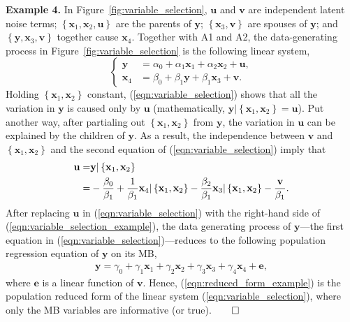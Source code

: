 \documentclass[11pt,review,authoryear]{elsarticle}
\begin{document}
\noindent
\textbf{Example 4.} In Figure~\ref{fig:variable_selection}, $\mathbf{u}$ and $\mathbf{v}$ are independent latent noise terms; $\left\{\mathbf{x}_1, \mathbf{x}_2, \mathbf{u}\right\}$ are the parents of $\mathbf{y}$; $\left\{\mathbf{x}_3, \mathbf{v}\right\}$ are spouses of $\mathbf{y}$; and $\left\{\mathbf{y}, \mathbf{x}_3, \mathbf{v}\right\}$ together cause $\mathbf{x}_4$. Together with A1 and A2, the data-generating process in Figure~\ref{fig:variable_selection} is the following linear system,
%
\begin{equation}
  \begin{cases}
    \mathbf{y}   & = \alpha_0 + \alpha_1 \mathbf{x}_1 + \alpha_2 \mathbf{x}_2 + \mathbf{u},\\
    \mathbf{x}_4 & = \beta_0  + \beta_1 \mathbf{y}    + \beta_1 \mathbf{x}_3  + \mathbf{v}.
  \end{cases}
  \label{eqn:variable_selection}
\end{equation}
%
Holding $\left\{\mathbf{x}_1, \mathbf{x}_2\right\}$ constant, (\ref{eqn:variable_selection}) shows that all the variation in $\mathbf{y}$ is caused only by $\mathbf{u}$ (mathematically, $\mathbf{y} \vert \left\{\mathbf{x}_1, \mathbf{x}_2\right\} = \mathbf{u}$). Put another way, after partialing out $\left\{ \mathbf{x}_1, \mathbf{x}_2 \right\}$ from $\mathbf{y}$, the variation in $\mathbf{u}$ can be explained by the children of $\mathbf{y}$. As a result, the independence between $\mathbf{v}$ and $\left\{ \mathbf{x}_1, \mathbf{x}_2 \right\}$ and the second equation of (\ref{eqn:variable_selection}) imply that
%
\begin{align}
  \mathbf{u} = & \mathbf{y} \vert \left\{\mathbf{x}_1, \mathbf{x}_2\right\} \notag \\
    = & - \frac{\beta_0}{\beta_1}  + \frac{1}{\beta_1} \mathbf{x}_4 \vert \left\{\mathbf{x}_1, \mathbf{x}_2\right\} - \frac{\beta_2}{\beta_1} \mathbf{x}_3 \vert \left\{\mathbf{x}_1, \mathbf{x}_2\right\} - \frac{\mathbf{v}}{\beta_1} .
  \label{eqn:variable_selection_example}
\end{align}
%
After replacing $\mathbf{u}$ in (\ref{eqn:variable_selection}) with the right-hand side of (\ref{eqn:variable_selection_example}), the data generating process of $\mathbf{y}$---the first equation in (\ref{eqn:variable_selection})---reduces to the following population regression equation of $\mathbf{y}$ on its MB,
%
\begin{align}
  \mathbf{y} = \gamma_0 + \gamma_1 \mathbf{x}_1 + \gamma_2 \mathbf{x}_2 + \gamma_3 \mathbf{x}_3 + \gamma_4 \mathbf{x}_4 + \mathbf{e},
  \label{eqn:reduced_form_example}
\end{align}
%
%
where $\mathbf{e}$ is a linear function of $\mathbf{v}$. Hence, (\ref{eqn:reduced_form_example}) is the population reduced form of the linear system (\ref{eqn:variable_selection}), where only the MB variables are informative (or true).$\qed$
\end{document}
